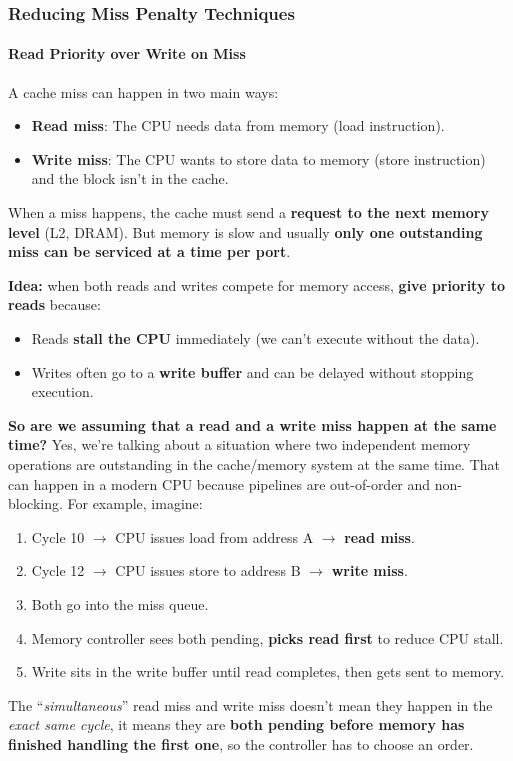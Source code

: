 \subsubsection{Reducing Miss Penalty Techniques}

\paragraph{Read Priority over Write on Miss}

A cache miss can happen in two main ways:
\begin{itemize}
    \item \textbf{Read miss}: The CPU needs data from memory (load instruction).
    \item \textbf{Write miss}: The CPU wants to store data to memory (store instruction) and the block isn't in the cache.
\end{itemize}
When a miss happens, the cache must send a \textbf{request to the next memory level} (L2, DRAM). But memory is slow and usually \textbf{only one outstanding miss can be serviced at a time per port}.

\highspace
\textbf{Idea:} when both reads and writes compete for memory access, \textbf{give priority to reads} because:
\begin{itemize}
    \item Reads \textbf{stall the CPU} immediately (we can't execute without the data).
    \item Writes often go to a \textbf{write buffer} and can be delayed without stopping execution.
\end{itemize}
\textcolor{Green3}{ \textbf{So are we assuming that a read and a write miss happen at the same time?}} Yes, we're talking about a situation where two independent memory operations are outstanding in the cache/memory system at the same time. That can happen in a modern CPU because pipelines are out-of-order and non-blocking. For example, imagine:
\begin{enumerate}
    \item Cycle 10 $\rightarrow$ CPU issues load from address A $\rightarrow$ \textbf{read miss}.
    \item Cycle 12 $\rightarrow$ CPU issues store to address B $\rightarrow$ \textbf{write miss}.
    \item Both go into the miss queue.
    \item Memory controller sees both pending, \textbf{picks read first} to reduce CPU stall.
    \item Write sits in the write buffer until read completes, then gets sent to memory.
\end{enumerate}
The ``\emph{simultaneous}'' read miss and write miss doesn't mean they happen in the \emph{exact same cycle}, it means they are \textbf{both pending before memory has finished handling the first one}, so the controller has to choose an order.

